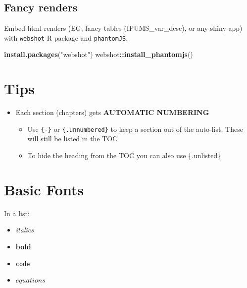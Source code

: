\documentclass[
]{book}
\newenvironment{Shaded}{\begin{snugshade}}{\end{snugshade}}
\newcommand{\FunctionTok}[1]{\textcolor[rgb]{0.13,0.29,0.53}{\textbf{#1}}}
\newcommand{\NormalTok}[1]{#1}
\newcommand{\SpecialCharTok}[1]{\textcolor[rgb]{0.81,0.36,0.00}{\textbf{#1}}}
\newcommand{\StringTok}[1]{\textcolor[rgb]{0.31,0.60,0.02}{#1}}
\providecommand{\tightlist}{%
  \setlength{\itemsep}{0pt}\setlength{\parskip}{0pt}}
\begin{document}
\hypertarget{fancy-renders}{%
\subsection{Fancy renders}\label{fancy-renders}}

Embed html renders (EG, fancy tables (IPUMS\_var\_desc), or any shiny app)
with \texttt{webshot} R package and \texttt{phantomJS}.

\begin{Shaded}
\begin{Highlighting}[]
\FunctionTok{install.packages}\NormalTok{(}\StringTok{"webshot"}\NormalTok{)}
\NormalTok{webshot}\SpecialCharTok{::}\FunctionTok{install\_phantomjs}\NormalTok{()}
\end{Highlighting}
\end{Shaded}

\hypertarget{tips}{%
\section*{Tips}\label{tips}}

\begin{itemize}
\tightlist
\item
  Each section (chapters) gets \textbf{AUTOMATIC NUMBERING}

  \begin{itemize}
  \tightlist
  \item
    Use \texttt{\{-\}} or \texttt{\{.unnumbered\}} to keep a section out of the auto-list. These will still be listed in the TOC
  \item
    To hide the heading from the TOC you can also use \{.unlisted\}
  \end{itemize}
\end{itemize}

\hypertarget{basic-fonts}{%
\section*{Basic Fonts}\label{basic-fonts}}

In a list:

\begin{itemize}
\item
  \emph{italics}
\item
  \textbf{bold}
\item
  \texttt{code}
\item
  \(equations\)
\end{itemize}
\end{document}
